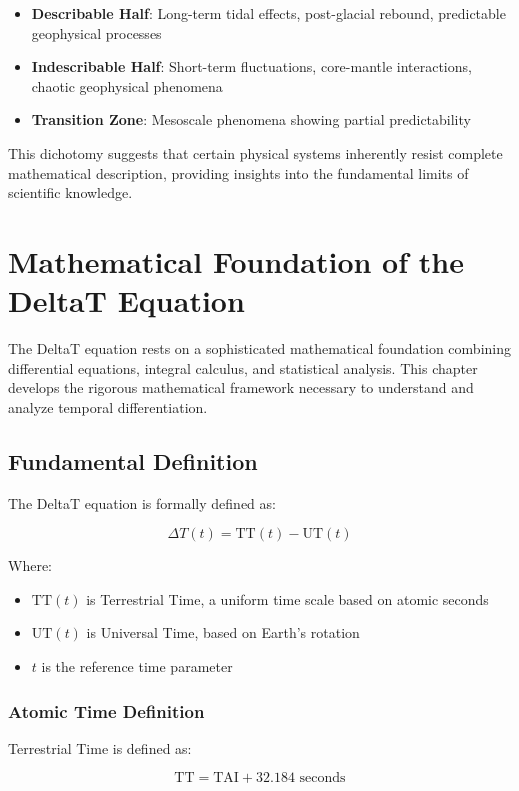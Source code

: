 \documentclass[12pt,a4paper]{report}
\newcommand{\TT}{\text{TT}}
\newcommand{\UT}{\text{UT}}
\newcommand{\TAI}{\text{TAI}}
\begin{document}
\begin{itemize}
\item \textbf{Describable Half}: Long-term tidal effects, post-glacial rebound, predictable geophysical processes
\item \textbf{Indescribable Half}: Short-term fluctuations, core-mantle interactions, chaotic geophysical phenomena
\item \textbf{Transition Zone}: Mesoscale phenomena showing partial predictability
\end{itemize}

This dichotomy suggests that certain physical systems inherently resist complete mathematical description, providing insights into the fundamental limits of scientific knowledge.

\chapter{Mathematical Foundation of the DeltaT Equation}

The DeltaT equation rests on a sophisticated mathematical foundation combining differential equations, integral calculus, and statistical analysis. This chapter develops the rigorous mathematical framework necessary to understand and analyze temporal differentiation.

\section{Fundamental Definition}

The DeltaT equation is formally defined as:

\[
\Delta T(t) = \TT(t) - \UT(t)
\]

Where:
\begin{itemize}
\item $\TT(t)$ is Terrestrial Time, a uniform time scale based on atomic seconds
\item $\UT(t)$ is Universal Time, based on Earth's rotation
\item $t$ is the reference time parameter
\end{itemize}

\subsection{Atomic Time Definition}

Terrestrial Time is defined as:

\[
\TT = \TAI + 32.184 \text{ seconds}
\]
\end{document}
